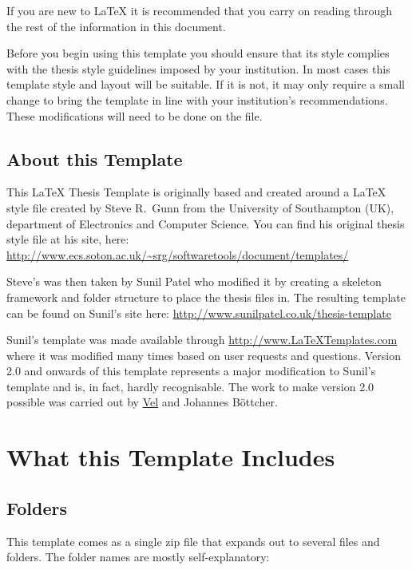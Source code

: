 If you are new to \LaTeX{} it is recommended that you carry on reading through the rest of the information in this document.

Before you begin using this template you should ensure that its style complies with the thesis style guidelines imposed by your institution. In most cases this template style and layout will be suitable. If it is not, it may only require a small change to bring the template in line with your institution's recommendations. These modifications will need to be done on the  file.

\subsection{About this Template}

This \LaTeX{} Thesis Template is originally based and created around a \LaTeX{} style file created by Steve R.\ Gunn from the University of Southampton (UK), department of Electronics and Computer Science. You can find his original thesis style file at his site, here:
\url{http://www.ecs.soton.ac.uk/~srg/softwaretools/document/templates/}

Steve's  was then taken by Sunil Patel who modified it by creating a skeleton framework and folder structure to place the thesis files in. The resulting template can be found on Sunil's site here:
\url{http://www.sunilpatel.co.uk/thesis-template}

Sunil's template was made available through \url{http://www.LaTeXTemplates.com} where it was modified many times based on user requests and questions. Version 2.0 and onwards of this template represents a major modification to Sunil's template and is, in fact, hardly recognisable. The work to make version 2.0 possible was carried out by \href{mailto:vel@latextemplates.com}{Vel} and Johannes Böttcher.


\section{What this Template Includes}

\subsection{Folders}

This template comes as a single zip file that expands out to several files and folders. The folder names are mostly self-explanatory:

